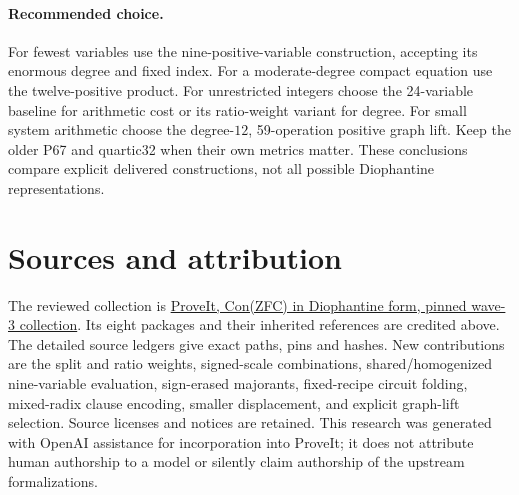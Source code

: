 \documentclass[11pt]{article}
\begin{document}
\paragraph{Recommended choice.}
For fewest variables use the nine-positive-variable construction, accepting
its enormous degree and fixed index. For a moderate-degree compact equation
use the twelve-positive product. For unrestricted integers choose the
24-variable baseline for arithmetic cost or its ratio-weight variant for
degree. For small system arithmetic choose the degree-$12$, 59-operation
positive graph lift. Keep the older P67 and quartic32 when their own metrics
matter. These conclusions compare explicit delivered constructions, not
all possible Diophantine representations.

\section*{Sources and attribution}
The reviewed collection is
\href{https://github.com/VladimirReshetnikov/ProveIt/tree/ae3007ca4467011e0e051c84acb4a1dd13971b0e/SetTheory/Cardinals/docs/reports/hilbert-tenth-problem/con-zfc-diophantine-forms}{ProveIt, Con(ZFC) in Diophantine form, pinned wave-3 collection}.
Its eight packages and their inherited references are credited above.
The detailed source ledgers give exact paths, pins and hashes. New contributions
are the split and ratio weights, signed-scale combinations, shared/homogenized
nine-variable evaluation, sign-erased majorants, fixed-recipe circuit folding,
mixed-radix clause encoding, smaller displacement, and explicit graph-lift
selection. Source licenses and notices are retained. This research was
generated with OpenAI assistance for incorporation into ProveIt; it does
not attribute human authorship to a model or silently claim authorship of
the upstream formalizations.
\end{document}
